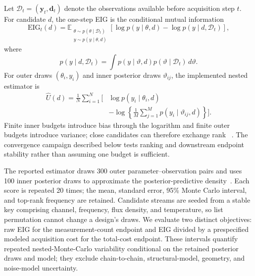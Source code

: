 \documentclass[10pt,a4paper,twocolumn]{article}
\providecommand{\EIGOuter}{300}
\providecommand{\EIGInner}{100}
\providecommand{\EIGReplicates}{20}
\begin{document}
Let $\mathcal D_t=(\mathbf y_t,\mathbf d_t)$ denote the observations available
before acquisition step $t$. For candidate $d$, the one-step EIG is
the conditional mutual information~\cite{lindley1956,chaloner1995}
\begin{equation}
 \mathrm{EIG}_t(d)=
 \mathbb E_{\substack{\theta\sim p(\theta\mid\mathcal D_t)\\
 y\sim p(y\mid\theta,d)}}
 \left[
 \log p(y\mid\theta,d)-\log p(y\mid d,\mathcal D_t)
 \right],
 \label{eq:eig}
\end{equation}
where
\begin{equation}
 p(y\mid d,\mathcal D_t)=
 \int p(y\mid\vartheta,d)
 p(\vartheta\mid\mathcal D_t)\,d\vartheta .
\end{equation}
For outer draws $(\theta_i,y_i)$ and inner posterior draws $\vartheta_{ij}$,
the implemented nested estimator is
\begin{equation}
 \begin{aligned}
 \widehat U(d)=\frac{1}{N}\sum_{i=1}^{N}\bigg[&
 \log p(y_i\mid\theta_i,d)\\[-0.2ex]
 &-\log\!\left\{\frac{1}{M}\sum_{j=1}^{M}
 p(y_i\mid\vartheta_{ij},d)\right\}\bigg].
 \end{aligned}
 \label{eq:nmc}
\end{equation}
Finite inner budgets introduce bias through the logarithm and finite outer
budgets introduce variance; close candidates can therefore exchange rank
~\cite{rainforth2018,goda2020}. The convergence campaign described below
tests ranking and downstream endpoint stability rather than assuming one
budget is sufficient.

The reported estimator draws \EIGOuter{} outer parameter--observation pairs
and uses \EIGInner{} inner posterior draws to approximate the posterior-predictive
density~\cite{ryan2003,rainforth2018}. Each score is repeated
\EIGReplicates{} times;
the mean, standard error, 95\% Monte Carlo interval, and top-rank frequency are
retained. Candidate streams are seeded from a stable key comprising channel,
frequency, flux density, and temperature, so list permutation cannot change a
design's draws. We evaluate two distinct objectives: raw EIG for the measurement-count endpoint
and EIG divided by a prespecified modeled acquisition cost for the total-cost
endpoint. These intervals quantify repeated nested-Monte-Carlo variability
conditional on the retained posterior draws and model; they exclude
chain-to-chain, structural-model, geometry, and noise-model uncertainty.
\end{document}
